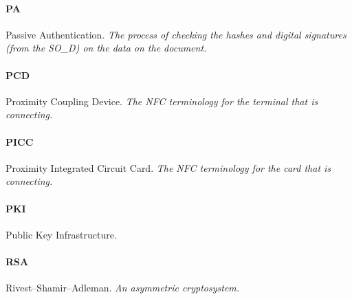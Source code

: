 \paragraph{PA} Passive Authentication. \textit{The process of checking the hashes and digital signatures (from the SO\_D) on the data on the document.}
\paragraph{PCD} Proximity Coupling Device. \textit{The NFC terminology for the terminal that is connecting.}
\paragraph{PICC} Proximity Integrated Circuit Card. \textit{The NFC terminology for the card that is connecting.}
\paragraph{PKI} Public Key Infrastructure. \textit{}
\paragraph{RSA} Rivest–Shamir–Adleman. \textit{An asymmetric cryptosystem.}
